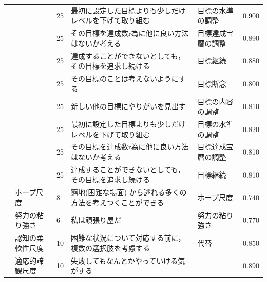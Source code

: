 \begin{landscape}
\begin{longtable}{p{2cm}p{2cm}p{2cm}p{6cm}p{2cm}p{2cm}}
                                 &                                  & 25  & 最初に設定した目標よりも少しだけレベルを下げて取り組む                         & 目標の水準の調整             & 0.900   \\
                                 &                                  & 25  & その目標を達成数r為に他に良い方法はないか考える                            & 目標達成宝暦の調整            & 0.890   \\
                                 &                                  & 25  & 達成することができないとしても，その目標を追求し続ける                         & 目標継続                 & 0.880   \\
                                 &                                  & 25  & その目標のことは考えないようにする                                   & 目標断念                 & 0.800   \\
                                 &                                  & 25  & 新しい他の目標にやりがいを見出す                                    & 目標の内容の調整             & 0.810   \\
                                 &                                  & 25  & 最初に設定した目標よりも少しだけレベルを下げて取り組む                         & 目標の水準の調整             & 0.820   \\
                                 &                                  & 25  & その目標を達成数r為に他に良い方法はないか考える                            & 目標達成宝暦の調整            & 0.810   \\
                                 &                                  & 25  & 達成することができないとしても，その目標を追求し続ける                         & 目標継続                 & 0.810   \\
                                 & ホープ尺度                            & 8   & 窮地(困難な場面) から逃れる多くの方法を考えつくことができる                     & ホープ尺度                & 0.740   \\
                                 & 努力の粘り強さ                          & 6   & 私は頑張り屋だ                                             & 努力の粘り強さ              & 0.770   \\
                                 & 認知の柔軟性尺度                         & 10  & 困難な状況について対応する前に，複数の選択肢を考慮する                         & 代替                   & 0.850   \\
                                 & 適応的諦観尺度                          & 10  & 失敗してもなんとかやっていける気がする                                 &                      & 0.890   \\

\end{longtable}
\end{landscape}
